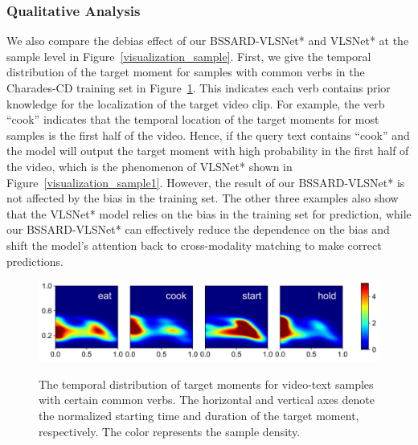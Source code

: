 \subsubsection{Qualitative Analysis}

We also compare the debias effect of our BSSARD-VLSNet* and VLSNet* at the sample level in Figure~\ref{visualization_sample}. 
First, we give the temporal distribution of the target moment for samples with common verbs in the Charades-CD training set in Figure~\ref{sample_bias_distribution}. This indicates each verb contains prior knowledge for the localization of the target video clip. 
For example, the verb ``cook'' indicates that the temporal location of the target moments for most samples is the first half of the video. 
Hence, if the query text contains ``cook'' and the model will output the target moment with high probability in the first half of the video, which is the phenomenon of VLSNet* shown in Figure~\ref{visualization_sample1}. However, the result of our BSSARD-VLSNet* is not affected by the bias in the training set. 
The other three examples also show that the VLSNet* model relies on the bias in the training set for prediction, while our BSSARD-VLSNet* can effectively reduce the dependence on the bias and shift the model's attention back to cross-modality matching to make correct predictions. 


\begin{figure}[t]
	\centering
	{\includegraphics[width=1\linewidth]{images/distribution_four_word.jpg}}%
	\caption{The temporal distribution of target moments for video-text samples with certain common verbs. The horizontal and vertical axes denote the normalized starting time and duration of the target moment, respectively. The color represents the sample density.}
	\label{sample_bias_distribution}
\end{figure}

